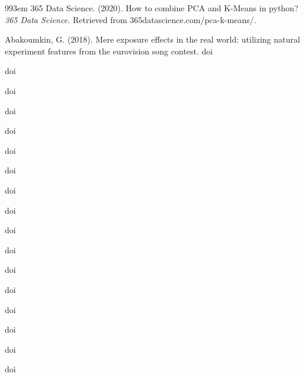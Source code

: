 \documentclass{article}
\begin{document}
\iffalse
\begingroup
\renewcommand{\section}[2]{}%
\renewcommand\bibindent{3em}
\setlength{\bibhang}{11pt}
\setlength{\bibitemsep}{6pt}
\begin{thebibliography}{99\kern\bibindent}
  365 Data Science. (2020). How to combine PCA and K-Means in python?
  \textit{365 Data Science.}
  Retrieved from 365datascience.com/pca-k-means/.


  Abakoumkin, G. (2018). Mere exposure effects in the real world: utilizing natural experiment 
  features from the eurovision song contest.
  \textit{}
  doi

  
  \textit{}
  doi

  
  \textit{}
  doi

  
  \textit{}
  doi


  
  \textit{}
  doi

  
  \textit{}
  doi

  
  \textit{}
  doi

  
  \textit{}
  doi


  
  \textit{}
  doi
  

  
  \textit{}
  doi


  
  \textit{}
  doi


  
  \textit{}
  doi


  
  \textit{}
  doi


  
  \textit{}
  doi

  
  \textit{}
  doi

  
  \textit{}
  doi


  
  \textit{}
  doi



\end{thebibliography}
\end{document}
